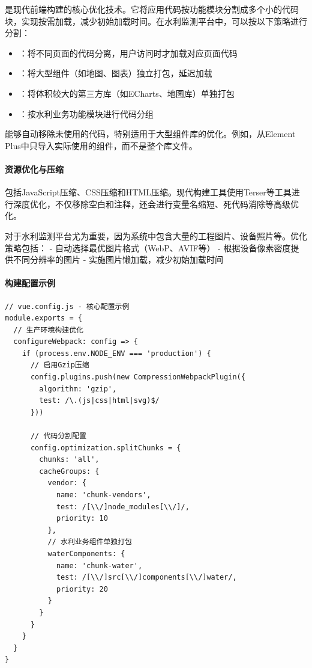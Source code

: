 是现代前端构建的核心优化技术。它将应用代码按功能模块分割成多个小的代码块，实现按需加载，减少初始加载时间。在水利监测平台中，可以按以下策略进行分割：

\begin{itemize}
\tightlist
\item
  ：将不同页面的代码分离，用户访问时才加载对应页面代码
\item
  ：将大型组件（如地图、图表）独立打包，延迟加载
\item
  ：将体积较大的第三方库（如ECharts、地图库）单独打包
\item
  ：按水利业务功能模块进行代码分组
\end{itemize}

能够自动移除未使用的代码，特别适用于大型组件库的优化。例如，从Element Plus中只导入实际使用的组件，而不是整个库文件。

\hypertarget{ux8d44ux6e90ux4f18ux5316ux4e0eux538bux7f29}{%
\paragraph{资源优化与压缩}\label{ux8d44ux6e90ux4f18ux5316ux4e0eux538bux7f29}}

包括JavaScript压缩、CSS压缩和HTML压缩。现代构建工具使用Terser等工具进行深度优化，不仅移除空白和注释，还会进行变量名缩短、死代码消除等高级优化。

对于水利监测平台尤为重要，因为系统中包含大量的工程图片、设备照片等。优化策略包括： - 自动选择最优图片格式（WebP、AVIF等） - 根据设备像素密度提供不同分辨率的图片 - 实施图片懒加载，减少初始加载时间

\hypertarget{ux6784ux5efaux914dux7f6eux793aux4f8b}{%
\paragraph{构建配置示例}\label{ux6784ux5efaux914dux7f6eux793aux4f8b}}

\begin{lstlisting}[style=javascript]
// vue.config.js - 核心配置示例
module.exports = {
  // 生产环境构建优化
  configureWebpack: config => {
    if (process.env.NODE_ENV === 'production') {
      // 启用Gzip压缩
      config.plugins.push(new CompressionWebpackPlugin({
        algorithm: 'gzip',
        test: /\.(js|css|html|svg)$/
      }))
      
      // 代码分割配置
      config.optimization.splitChunks = {
        chunks: 'all',
        cacheGroups: {
          vendor: {
            name: 'chunk-vendors',
            test: /[\\/]node_modules[\\/]/,
            priority: 10
          },
          // 水利业务组件单独打包
          waterComponents: {
            name: 'chunk-water',
            test: /[\\/]src[\\/]components[\\/]water/,
            priority: 20
          }
        }
      }
    }
  }
}
\end{lstlisting}


